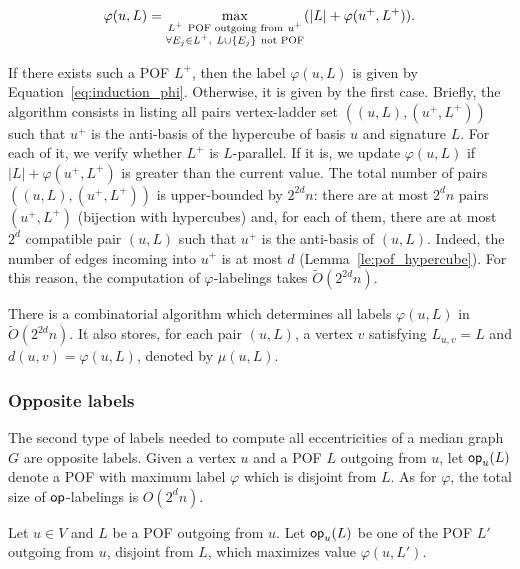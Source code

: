 \documentclass[a4paper,UKenglish,numberwithinsect,cleveref, autoref]{lipics-v2021}
\newcommand{\set}[1]{\left\{ #1 \right\}}
\newcommand{\card}[1]{\left| #1 \right|}
\newcommand{\opp}{\mbox{\textsf{op}}}
\begin{document}
\begin{equation}
    \varphi(u,L) = \max\limits_{\substack{L^+ ~\mbox{\scriptsize{POF outgoing from}}~ u^+ \\ \forall E_j \in L^+,~ L \cup \set{E_j} ~\mbox{\scriptsize{not POF}}}} (\card{L} + \varphi(u^+,L^+)).
\label{eq:induction_phi}
\end{equation}

If there exists such a POF $L^+$, then the label $\varphi(u,L)$ is given by Equation~\eqref{eq:induction_phi}. Otherwise, it is given by the first case. Briefly, the algorithm consists in listing all pairs vertex-ladder set $((u,L),(u^+,L^+))$ such that $u^+$ is the anti-basis of the hypercube of basis $u$ and signature $L$. For each of it, we verify whether $L^+$ is $L$-parallel. If it is, we update $\varphi(u,L)$ if $\card{L} + \varphi(u^+,L^+)$ is greater than the current value. The total number of pairs $((u,L),(u^+,L^+))$ is upper-bounded by $2^{2d}n$: there are at most $2^dn$ pairs $(u^+,L^+)$ (bijection with hypercubes) and, for each of them, there are at most $2^d$ compatible pair $(u,L)$ such that $u^+$ is the anti-basis of $(u,L)$. Indeed, the number of edges incoming into $u^+$ is at most $d$ (Lemma~\ref{le:pof_hypercube}). For this reason, the computation of $\varphi$-labelings takes $\tilde{O}(2^{2d}n)$.

\begin{theorem}
There is a combinatorial algorithm which determines all labels $\varphi(u,L)$ in $\tilde{O}(2^{2d}n)$. It also stores, for each pair $(u,L)$, a vertex $v$ satisfying $L_{u,v} = L$ and $d(u,v) = \varphi(u,L)$, denoted by $\mu(u,L)$.
\label{th:compute_phi}
\end{theorem}

\subsubsection{Opposite labels}

The second type of labels needed to compute all eccentricities of a median graph $G$ are opposite labels. %
Given a vertex $u$ and a POF $L$ outgoing from $u$, let $\opp_u(L)$ denote a POF with maximum label $\varphi$ which is disjoint from $L$. As for $\varphi$, the total size of $\opp$-labelings is $O(2^dn)$.

\begin{definition}[Labels $\opp$~\cite{BeHa21}]
Let $u \in V$ and $L$ be a POF outgoing from $u$. Let $\opp_u(L)$ be one of the POF $L'$ outgoing from $u$, disjoint from $L$, which maximizes value $\varphi(u,L')$.
\end{definition}
\end{document}
